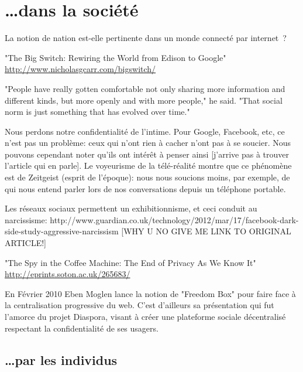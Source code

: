 \chapter{\ldots dans la société}

La notion de nation est-elle pertinente dans un monde connecté par
internet~?

"The Big Switch: Rewiring the World from Edison to Google" 
 \url{http://www.nicholasgcarr.com/bigswitch/}
 
\begin{coolquote}
"People have really gotten comfortable not only sharing more information and different kinds, but more openly and with more people," he said. "That social norm is just something that has evolved over time."
\end{coolquote}

Nous perdons notre confidentialité de l'intime. Pour Google, Facebook, etc, 
ce n'est pas un problème: ceux qui n'ont rien à cacher n'ont pas à se soucier. Nous
pouvons cependant noter qu'ils ont intérêt à penser ainsi [j'arrive pas à 
trouver l'article qui en parle]. Le voyeurisme de la télé-réalité montre 
que ce phénomène est de Zeitgeist (esprit de l'époque): nous nous soucions 
moins, par exemple, de qui nous entend parler lors de nos
conversations depuis un téléphone portable.

Les réseaux sociaux permettent un exhibitionnisme, et ceci conduit au 
narcissisme:
http://www.guardian.co.uk/technology/2012/mar/17/facebook-dark-side-study-aggressive-narcissism 
[WHY U NO GIVE ME LINK TO ORIGINAL ARTICLE!]

"The Spy in the Coffee Machine: The End of Privacy As We Know It"
 \url{http://eprints.soton.ac.uk/265683/}

En Février 2010 Eben Moglen lance la notion de "Freedom Box" pour faire face à
la centralisation progressive du web. C'est d'ailleurs sa présentation qui fut
l'amorce du projet Diaspora, visant à créer une plateforme sociale décentralisé 
respectant la confidentialité de ses usagers. 

\section{\ldots par les individus}


